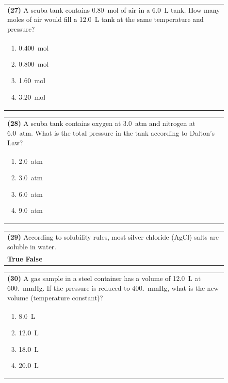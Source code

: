 \documentclass{article}
\begin{document}
\noindent\begin{tabular}{|p{0.9\linewidth}|}
\hline
\textbf{(27)} A scuba tank contains 0.80~mol of air in a 6.0~L tank. How many moles of air would fill a 12.0~L tank at the same temperature and pressure?\\[0.2cm]
\begin{minipage}[t]{0.85\linewidth}
\begin{enumerate}[label=\alph*.]
\item 0.400~mol
\item 0.800~mol
\item 1.60~mol
\item 3.20~mol
\end{enumerate}
\end{minipage}\\[0.2cm]
\hline
\end{tabular}

\noindent\begin{tabular}{|p{0.9\linewidth}|}
\hline
\textbf{(28)} A scuba tank contains oxygen at 3.0~atm and nitrogen at 6.0~atm. What is the total pressure in the tank according to Dalton's Law?\\[0.2cm]
\begin{minipage}[t]{0.85\linewidth}
\begin{enumerate}[label=\alph*.]
\item 2.0~atm
\item 3.0~atm
\item 6.0~atm
\item 9.0~atm
\end{enumerate}
\end{minipage}\\[0.2cm]
\hline
\end{tabular}
\newpage

\vspace{0.2cm}
\noindent\begin{tabular}{|p{0.9\linewidth}|}
\hline
\textbf{(29)} According to solubility rules, most silver chloride (AgCl) salts are soluble in water.\\[0.2cm]
\textbf{True} \hspace{1cm} \textbf{False}\\[0.2cm]
\hline
\end{tabular}

\vspace{0.2cm}
\noindent\begin{tabular}{|p{0.9\linewidth}|}
\hline
\textbf{(30)} A gas sample in a steel container has a volume of 12.0~L at 600.~mmHg. If the pressure is reduced to 400.~mmHg, what is the new volume (temperature constant)?\\[0.2cm]
\begin{minipage}[t]{0.85\linewidth}
\begin{enumerate}[label=\alph*.]
\item 8.0~L
\item 12.0~L
\item 18.0~L
\item 20.0~L
\end{enumerate}
\end{minipage}\\[0.2cm]
\hline
\end{tabular}
\end{document}
